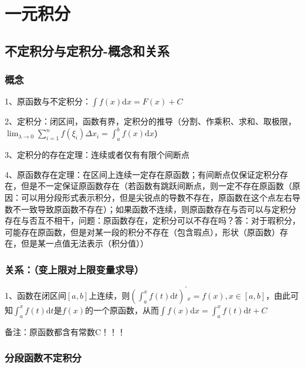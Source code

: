 \chapter{一元积分}

\section{不定积分与定积分-概念和关系}



\subsection{概念}

1、原函数与不定积分：$\int f(x) \mathrm{d} x=F(x)+C$

2、定积分：闭区间，函数有界，定积分的推导（分割、作乘积、求和、取极限，$\lim _{\lambda \rightarrow 0} \sum_{i=1}^{n} f\left(\xi_{i}\right) \Delta x_{i}=\int_{a}^{b} f(x) \mathrm{d} x$）

3、定积分的存在定理：连续或者仅有有限个间断点

4、原函数存在定理：在区间上连续一定存在原函数；有间断点仅保证定积分存在，但是不一定保证原函数存在（若函数有跳跃间断点，则一定不存在原函数（原因：可以用分段形式表示积分，但是尖锐点的导数不存在，原函数在这个点左右导数不一致导致原函数不存在）；如果函数不连续，则原函数存在与否可以与定积分存在与否互不相干，问题：原函数存在，定积分可以不存在吗？答：对于瑕积分，可能存在原函数，但是对某一段的积分不存在（包含瑕点），形状（原函数）存在，但是某一点值无法表示（积分值））



\subsection{关系：（变上限对上限变量求导）}

1、函数在闭区间$[a,b]$上连续，则$\left(\int_{a}^{x} f(t) \mathrm{d} t\right)^{\prime}{ }_{x}=f(x), x \in[a, b]$，由此可知$\int_{a}^{x} f(t) \mathrm{d} t$是$f(x)$的一个原函数，从而$\int f(x) \mathrm{d} x=\int_{a}^{x} f(t) \mathrm{d} t+C$

备注：原函数都含有常数C！！！



\subsection{分段函数不定积分}

